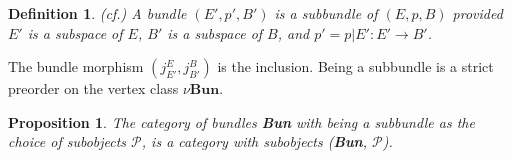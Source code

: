 \documentclass[10pt,a4paper]{amsart}
\newtheorem{prop}{Proposition}
\newtheorem{defn}{Definition}
\begin{document}
	\begin{defn}(cf.\cite{Dale}) \label{subbundle}
	A bundle $(E',p',B')$ is a subbundle of $(E,p,B)$ provided $E'$ is a subspace of $E$, $B'$ is a subspace of $B$, and $p' = p|E' : E' \rightarrow B'$.
\end{defn}
\begin{center}
\end{center}
The bundle morphism $(j_{E'}^{E}, j_{B'}^{B})$ is the inclusion. Being a subbundle is a strict preorder on the vertex class $\nu \textbf{Bun}$.

\begin{prop}
	 The category of bundles \textbf{Bun} with being a subbundle as the choice of subobjects $\mathcal {P}$, is a category with subobjects (\textbf{Bun}, $\mathcal {P}$).
\end{prop}
\end{document}
